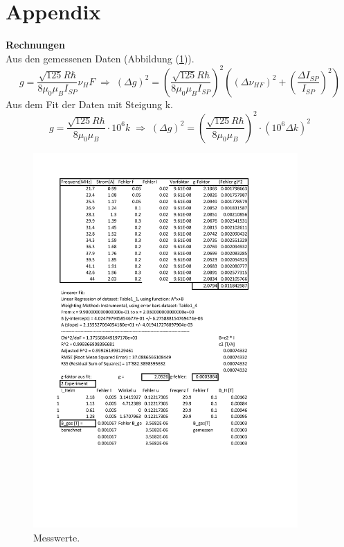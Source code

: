 \documentclass[a4paper,10pt]{scrartcl} %
\begin{document}
\section{Appendix}
\label{sec:appendix}
\textbf{Rechnungen}\\
Aus den gemessenen Daten (Abbildung (\ref{fig:wertetabelle})).
\begin{equation}
\label{eqn:g-Fehler1}
g = \frac{\sqrt{125} R \hbar}{8 \mu _0 \mu _B I_{SP}} \nu _HF \; \Rightarrow \; (\Delta g)^2 = (\frac{\sqrt{125} R \hbar}{8 \mu _0 \mu _B I_{SP}})^2( (\Delta \nu _{HF})^2 + (\frac{\Delta I_{SP}}{I_{SP}})^2)
\end{equation}
Aus dem Fit der Daten mit Steigung k.
\begin{equation}
\label{eqn:g-Fehler2}
g = \frac{\sqrt{125} R \hbar}{8 \mu _0 \mu _B} \cdot 10^6 k \; \Rightarrow \; (\Delta g)^2 = (\frac{\sqrt{125} R \hbar}{8 \mu _0 \mu _B})^2 \cdot (10^6 \Delta k)^2
\end{equation}
\begin{figure}
\label{fig:wertetabelle}
\includegraphics[width=0.9\textwidth]{Daten/Tabelle.pdf}
\caption{Messwerte.}
\end{figure}


\end{document}
